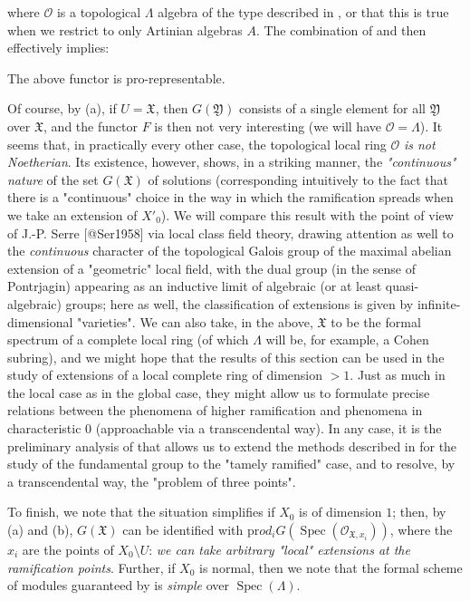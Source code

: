where $\mathcal{O}$ is a topological $\Lambda$ algebra of the type described in , or that this is true when we restrict to only Artinian algebras $A$.
The combination of  and  then effectively implies:

\begin{proposition}\label{fga3.ii-c.5-proposition-5.1}
    The above functor is pro-representable.
\end{proposition}

Of course, by (a), if $U=\mathfrak{X}$, then $G(\mathfrak{Y})$ consists of a single element for all $\mathfrak{Y}$ over $\mathfrak{X}$, and the functor $F$ is then not very interesting (we will have $\mathcal{O}=\Lambda$).
It seems that, in practically every other case, the topological local ring $\mathcal{O}$ \emph{is not Noetherian}.
Its existence, however, shows, in a striking manner, the \emph{"continuous" nature} of the set $G(\mathfrak{X})$ of solutions (corresponding intuitively to the fact that there is a "continuous" choice in the way in which the ramification spreads when we take an extension of $X'_0$).
We will compare this result with the point of view of J.-P. Serre [@Ser1958] via local class field theory, drawing attention as well to the \emph{continuous} character of the topological Galois group of the maximal abelian extension of a "geometric" local field, with the dual group (in the sense of Pontrjagin) appearing as an inductive limit of algebraic (or at least quasi-algebraic) groups;
here as well, the classification of extensions is given by infinite-dimensional "varieties".
We can also take, in the above, $\mathfrak{X}$ to be the formal spectrum of a complete local ring (of which $\Lambda$ will be, for example, a Cohen subring), and we might hope that the results of this section can be used in the study of extensions of a local complete ring of dimension $>1$.
Just as much in the local case as in the global case, they might allow us to formulate precise relations between the phenomena of higher ramification and phenomena in characteristic $0$ (approachable via a transcendental way).
In any case, it is the preliminary analysis of  that allows us to extend the methods described in  for the study of the fundamental group to the "tamely ramified" case, and to resolve, by a transcendental way, the "problem of three points".

To finish, we note that the situation simplifies if $X_0$ is of dimension $1$;
then, by (a) and (b), $G(\mathfrak{X})$ can be identified with $\mathrm{pr}od_i G(\operatorname{Spec}(\mathcal{O}_{\mathfrak{X},x_i}))$, where the $x_i$ are the points of $X_0\setminus U$:
\emph{we can take arbitrary "local" extensions at the ramification points}.
Further, if $X_0$ is normal, then we note that the formal scheme of modules guaranteed by  is \emph{simple} over $\operatorname{Spec}(\Lambda)$.
